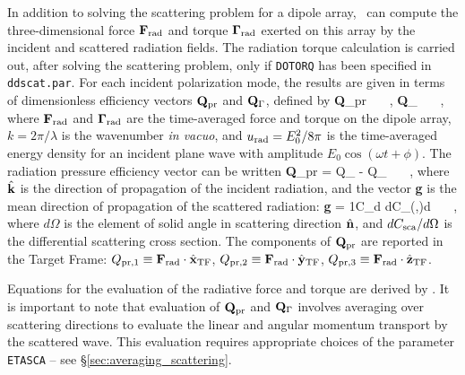 In addition to solving the scattering problem for a dipole array,
\ddscat\ can compute the three-dimensional force ${\bf F}_{\rm rad}$ 
and torque ${\bf \Gamma}_{\rm rad}$ exerted on this array by the
incident and scattered radiation fields.  
The radiation torque calculation is carried
out, after solving the scattering problem, only if {\tt DOTORQ} has
been specified in {\tt ddscat.par}.  
For each incident polarization
mode, the results are given in terms of dimensionless efficiency
vectors ${\bf Q}_{\rm pr}$ and ${\bf Q}_{\Gamma}$, defined by
\beq
{\bf Q}_{\rm pr}  ~~~,
\eeq
\beq
{\bf Q}_\Gamma {} ~~~,
\eeq
where ${\bf F}_{\rm rad}$ and ${\bf \Gamma}_{\rm rad}$ are the time-averaged
force and torque on the dipole array, $k=2\pi/\lambda$ is the
wavenumber {\it in vacuo}, and $u_{\rm rad} = E_0^2/8\pi$ is the
time-averaged energy density for an incident plane wave with amplitude
$E_0 \cos(\omega t + \phi)$.  The radiation pressure efficiency vector
can be written
\beq
{\bf Q}_{\rm pr} = Q_ - Q_ ~~~,
\eeq
where ${\hat{\bf k}}$ is the direction of propagation of the incident
radiation, and the vector {\bf g} is the mean direction of propagation
of the scattered radiation:
\beq\label{eq:gvec}
{\bf g} = {1\over C_\sca}\int d\Omega
{dC_\sca({},{})\over d\Omega} {} ~~~,
\eeq
where $d\Omega$ is the element of solid angle in scattering direction
${\hat{\bf n}}$, and $dC_{\rm sca}/d\Omega$ is the differential scattering
cross section.
The components of ${\bf Q}_{\rm pr}$ are reported in the Target Frame:
$Q_{{\rm pr},1}\equiv {\bf F}_{\rm rad}\cdot \hat{\bf x}_{\rm TF}$,
$Q_{{\rm pr},2}\equiv {\bf F}_{\rm rad}\cdot \hat{\bf y}_{\rm TF}$,
$Q_{{\rm pr},3}\equiv {\bf F}_{\rm rad}\cdot \hat{\bf z}_{\rm TF}$.

Equations for the evaluation of the radiative force and torque are
derived by \citet{Draine+Weingartner_1996}.  It is important to note that
evaluation of ${\bf Q}_{\rm pr}$ and ${\bf Q}_\Gamma$ involves averaging
over scattering directions to evaluate the linear and angular momentum
transport by the scattered wave.  This evaluation requires appropriate
choices of the parameter {\tt ETASCA} -- see
\S\ref{sec:averaging_scattering}.

